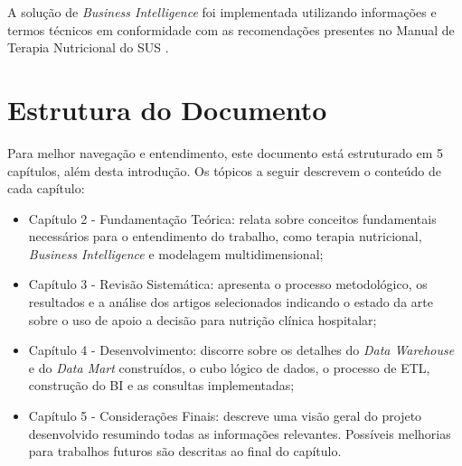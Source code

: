 A solução de \textit{Business Intelligence} foi implementada utilizando informações e termos técnicos em conformidade com as recomendações presentes no Manual de Terapia Nutricional do SUS \cite{manualnutricao2016}.

\section{Estrutura do Documento}\label{sec-divisoes}
Para melhor navegação e entendimento, este documento está estruturado em 5 capítulos, além desta introdução. Os tópicos a seguir descrevem o conteúdo de cada capítulo:
\begin{itemize}
 \item Capítulo 2 - Fundamentação Teórica: relata sobre conceitos fundamentais necessários para o entendimento do trabalho, como terapia nutricional, \textit{Business Intelligence} e modelagem multidimensional;

 \item Capítulo 3 - Revisão Sistemática: apresenta o processo metodológico, os resultados e a análise dos artigos selecionados indicando o estado da arte sobre o uso de apoio a decisão para nutrição clínica hospitalar;

 \item Capítulo 4 - Desenvolvimento: discorre sobre os detalhes do \textit{Data Warehouse} e do \textit{Data Mart} construídos, o cubo lógico de dados, o processo de ETL, construção do BI e as consultas implementadas;
 
 \item Capítulo 5 - Considerações Finais: descreve uma visão geral do projeto desenvolvido resumindo todas as informações relevantes. Possíveis melhorias para trabalhos futuros são descritas ao final do capítulo.
\end{itemize}